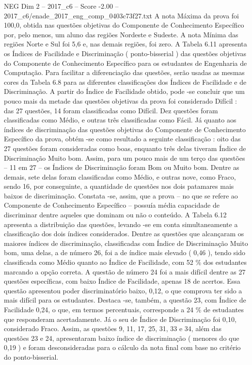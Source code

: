 \begin{textsample}{NEG Dim 2 – 2017\_c6 – Score -2.00 – 2017\_c6/enade\_2017\_eng\_comp\_0403c73f27.txt}
A nota Máxima da prova foi 100,0, obtida nas questões objetivas do Componente de Conhecimento Específico por, pelo menos, um aluno das regiões Nordeste e Sudeste.
A nota Mínima das regiões Norte e Sul foi 5,6 e, nas demais regiões, foi zero.
A Tabela 6.11 apresenta os Índices de Facilidade e Discriminação ( ponto-bisserial ) das questões objetivas do Componente de Conhecimento Específico para os estudantes de Engenharia de Computação.
Para facilitar a diferenciação das questões, serão usadas as mesmas cores da Tabela 6.8 para as diferentes classificações dos Índices de Facilidade e de Discriminação.
A partir do Índice de Facilidade obtido, pode -se concluir que um pouco mais da metade das questões objetivas da prova foi considerado Difícil : das 27 questões, 14 foram classificadas como Difícil.
Dez questões foram classificadas como Médio, e outras três classificadas como Fácil.
Já quanto aos índices de discriminação das questões objetivas do Componente de Conhecimento Específico da prova, obtém -se como resultado a seguinte classificação : oito das 27 questões foram consideradas como boas, enquanto três delas tiveram Índice de Discriminação Muito bom.
Assim, para um pouco mais de um terço das questões – 11 em 27 – os Índices de Discriminação foram Bom ou Muito bom.
Dentre as demais, sete delas foram classificadas como Médio, e outras nove, como Fraco, sendo 16, por conseguinte, a quantidade de questões nos dois patamares mais baixos de discriminação.
Constata -se, assim, que a prova – no que se refere ao Componente de Conhecimento Específico – possuía média capacidade de discriminar dentre aqueles que dominam ou não o conteúdo.
A Tabela 6.12 apresenta a distribuição das questões, levando -se em conta simultaneamente a classificação dos dois índices considerados.
Dentre as questões que alcançaram os maiores índices de discriminação, classificadas com Índice de Discriminação Muito bom, uma delas, a de número 26, foi a de índice mais elevado ( 0,46 ), tendo sido classificada como Médio quanto ao Índice de Facilidade, com 52 \% dos estudantes marcando a opção correta.
A questão de número 24 foi a mais difícil dentre as 27 questões específicas, com baixo Índice de Facilidade, apenas 18 de acertos.
Essa questão apresentou poder discriminatório baixo, 0,12, o que comprova ter sido a mais difícil para os estudantes.
Destaca -se, também, a questão 23, com Índice de Facilidade 0,24, o que, em termos percentuais, corresponde a 24 \% de estudantes que responderam acertadamente.
Já o seu de Índice de Discriminação foi 0,10, considerado Fraco.
Assim, as questões 9, 11, 17, 25, 31, 33 e 34, além das questões 23 e 24, apresentaram baixo índice de discriminação ( menores do que 0,19 ) e foram desconsideradas para o cálculo da nota final com base no critério do ponto-bisserial.

\end{textsample}
